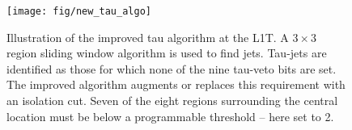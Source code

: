\begin{figure}
\centering
\texttt{[image: fig/new\_tau\_algo]}
\caption[]{Illustration of the improved tau algorithm at the \ac{L1T}. A
  $3\times 3$ region sliding window algorithm is used to find jets. Tau-jets are
  identified as those for which none of the nine tau-veto bits are set. The
  improved algorithm augments or replaces this requirement with an isolation
  cut. Seven of the eight regions surrounding the central location must be below
  a programmable threshold -- here set to \unit{2}{\GeV}.}
\label{fig:l1t_tau_algo}
\end{figure}
